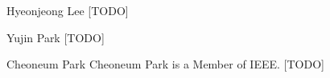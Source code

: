 \documentclass[journal]{IEEEtran}
\begin{document}
\ifCLASSOPTIONcaptionsoff
  \newpage
\fi




\begin{IEEEbiographynophoto}{Hyeonjeong Lee}
  [TODO]
\end{IEEEbiographynophoto}

\begin{IEEEbiographynophoto}{Yujin Park}
  [TODO]
\end{IEEEbiographynophoto}

\begin{IEEEbiographynophoto}{Cheoneum Park}
  Cheoneum Park is a Member of IEEE. [TODO]
\end{IEEEbiographynophoto}
\end{document}
